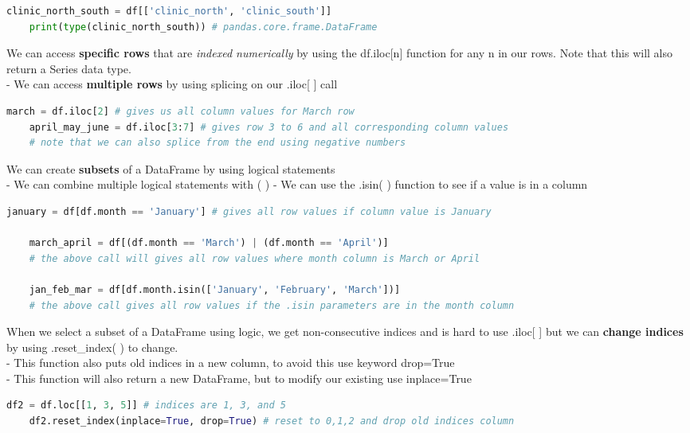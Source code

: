 \documentclass[11pt, a4paper]{article}
\begin{document}
\begin{spacing}{1.1}
\begin{lstlisting}[language=Python]
	clinic_north_south = df[['clinic_north', 'clinic_south']]
	print(type(clinic_north_south)) # pandas.core.frame.DataFrame \end{lstlisting}\vspace*{1mm}
	We can access \textbf{specific rows} that are \textit{indexed numerically} by using the df.iloc[n] function for any n in our rows. Note that this will also return a Series data type. \\
	\hspace*{4mm} - We can access \textbf{multiple rows} by using splicing on our .iloc[ ] call 
	\begin{lstlisting}[language=Python]
	march = df.iloc[2] # gives us all column values for March row
	april_may_june = df.iloc[3:7] # gives row 3 to 6 and all corresponding column values
	# note that we can also splice from the end using negative numbers \end{lstlisting}\vspace*{1mm}
	We can create \textbf{subsets} of a DataFrame by using logical statements \\
	\hspace*{4mm} - We can combine multiple logical statements with ( ) 
	\hspace*{4mm} - We can use the .isin( ) function to see if a value is in a column
	\begin{lstlisting}[language=Python]
	january = df[df.month == 'January'] # gives all row values if column value is January
	
	march_april = df[(df.month == 'March') | (df.month == 'April')]
	# the above call will gives all row values where month column is March or April
	
	jan_feb_mar = df[df.month.isin(['January', 'February', 'March'])]
	# the above call gives all row values if the .isin parameters are in the month column\end{lstlisting}\vspace*{1mm}
	When we select a subset of a DataFrame using logic, we get non-consecutive indices and is hard to use .iloc[ ] but we can \textbf{change indices} by using .reset\_index( ) to change. \\ 
	\hspace*{4mm} - This function also puts old indices in a new column, to avoid this use keyword drop=True \\
	\hspace*{4mm} - This function will also return a new DataFrame, but to modify our existing use inplace=True
	\begin{lstlisting}[language=Python]
	df2 = df.loc[[1, 3, 5]] # indices are 1, 3, and 5
	df2.reset_index(inplace=True, drop=True) # reset to 0,1,2 and drop old indices column\end{lstlisting}\vspace*{4mm}
	

\end{spacing}
\end{document}
